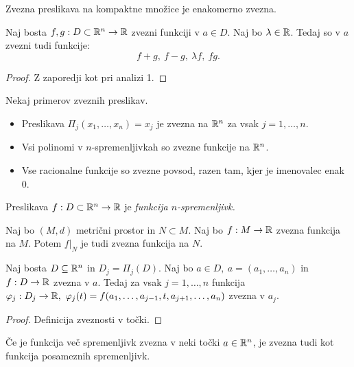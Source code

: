 \begin{opomba}
    Zvezna preslikava na kompaktne množice je enakomerno zvezna.
\end{opomba}

\begin{trditev}
    Naj bosta $f, g: D \subset \mathbb{R}^n \to \mathbb{R}$ zvezni funkciji v $a \in D$. Naj bo $\lambda \in \mathbb{R}$. Tedaj so v $a$ zvezni tudi funkcije:
    $$f+g, \ f-g, \ \lambda f, \ fg.$$
\end{trditev}

\begin{proof}
    Z zaporedji kot pri analizi 1.
\end{proof}

\begin{zgled}
    Nekaj primerov zveznih preslikav.
    \begin{itemize}
        \item Preslikava $\Pi_j(x_1, \ldots, x_n) = x_j$ je zvezna na $\mathbb{R}^n$ za vsak $j = 1, \ldots, n$.
        \item Vsi polinomi v $n$-spremenljivkah so zvezne funkcije na $\mathbb{R}^n$.
        \item Vse racionalne funkcije so zvezne povsod, razen tam, kjer je imenovalec enak $0$.
    \end{itemize}
\end{zgled}

\begin{definicija}
    Preslikava $f: D \subset \mathbb{R}^n \to \mathbb{R}$ je \emph{funkcija $n$-spremenljivk.}
\end{definicija}

\begin{opomba}
    Naj bo $(M, d)$ metrični prostor in $N \subset M$. Naj bo $f: M \to \mathbb{R}$ zvezna funkcija na $M$. Potem $f|_N$ je tudi zvezna funkcija na $N$.
\end{opomba}

\begin{trditev}
    Naj bosta $D \subseteq \mathbb{R}^n$ in $D_j = \Pi_j(D)$. Naj bo $a \in D, \ a =(a_1, \ldots, a_n)$ in $f: D \to \mathbb{R}$ zvezna v $a$. Tedaj za vsak $j = 1, \ldots, n$ funkcija $\varphi_j: D_j \to \RR, \ \varphi_j(t) = f(a_1, \ldots, a_{j-1}, t, a_{j+1}, \ldots, a_n)$ zvezna v $a_j$.
\end{trditev}

\begin{proof}
    Definicija zveznosti v točki.
\end{proof}

\begin{opomba}
    Če je funkcija več spremenljivk zvezna v neki točki $a \in \mathbb{R}^n$, je zvezna tudi kot funkcija posameznih spremenljivk.
\end{opomba}


